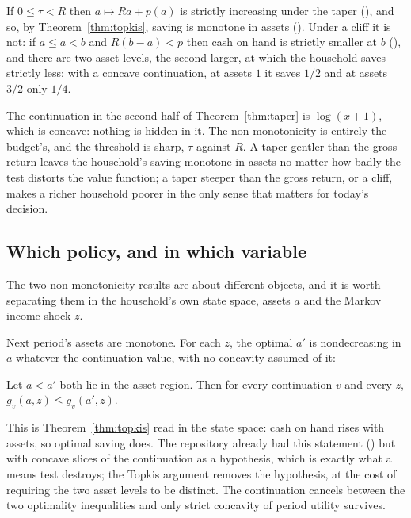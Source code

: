\begin{theorem}\label{thm:taper}
If $0\le\tau<R$ then $a\mapsto Ra+p(a)$ is strictly increasing under the taper
(), and so, by Theorem~\ref{thm:topkis}, saving is monotone in
assets (). Under a cliff it is not: if $a\le\bar a<b$ and
$R(b-a)<p$ then cash on hand is strictly smaller at $b$ (), and
there are two asset levels, the second larger, at which the household saves strictly less: with a
concave continuation, at assets $1$ it saves $1/2$ and at assets $3/2$ only $1/4$.
\end{theorem}

The continuation in the second half of Theorem~\ref{thm:taper} is $\log(x+1)$, which is concave:
nothing is hidden in it. The non-monotonicity is entirely the budget's, and the threshold is
sharp, $\tau$ against $R$. A taper gentler than the gross return leaves the household's saving
monotone in assets no matter how badly the test distorts the value function; a taper steeper than
the gross return, or a cliff, makes a richer household poorer in the only sense that matters for
today's decision.

\subsection{Which policy, and in which variable}

The two non-monotonicity results are about different objects, and it is worth separating them in
the household's own state space, assets $a$ and the Markov income shock $z$.

Next period's assets are monotone. For each $z$, the optimal $a'$ is nondecreasing in $a$
whatever the continuation value, with no concavity assumed of it:

\begin{theorem}\label{thm:azmono}
Let $a<a'$ both lie in the asset region. Then for every continuation $v$ and every $z$,
$g_v(a,z)\le g_v(a',z)$.
\end{theorem}

This is Theorem~\ref{thm:topkis} read in the state space: cash on hand rises with assets, so
optimal saving does. The repository already had this statement () but with
concave slices of the continuation as a hypothesis, which is exactly what a means test destroys;
the Topkis argument removes the hypothesis, at the cost of requiring the two asset levels to be
distinct. The continuation cancels between the two optimality inequalities and only strict
concavity of period utility survives.

